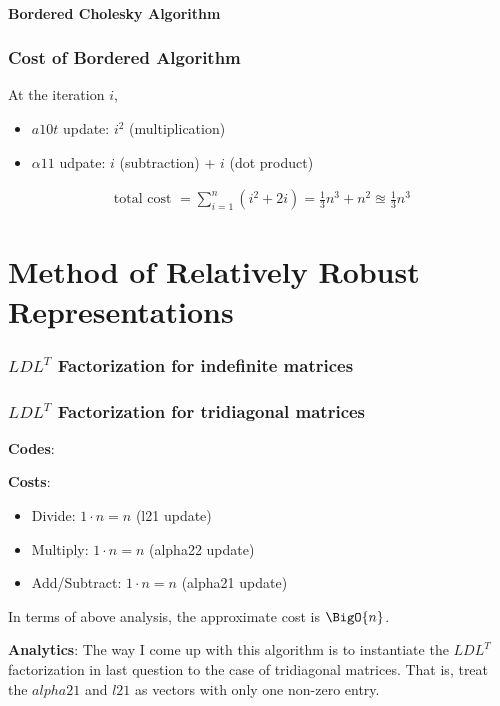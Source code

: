 \documentclass[11pt,a4paper]{article}
\begin{document}
\newpage
\subsection{Bordered Cholesky Algorithm}
 \vspace{0.5cm}

\section{Cost of Bordered Algorithm}
At the iteration $i$, 
\begin{itemize}
    \item $a10t$ update: $i^2$ (multiplication)
    \item $\alpha11$ udpate: $i$ (subtraction) + $i$ (dot product) 
\end{itemize}
\begin{align}
    \text{ total cost } = \sum_{i = 1}^n (i^2 + 2i) = \frac{1}{3} n^3 + n^2
    \approxeq \frac{1}{3} n^3
\end{align}
\newpage
\part{Method of Relatively Robust Representations}
\setcounter{section}{0}
\section{$LDL^T$ Factorization for indefinite matrices}

\newpage

\section{$LDL^T$ Factorization for tridiagonal matrices}
\textbf{Codes}:


\noindent
\textbf{Costs}: 
\begin{itemize}
    \item Divide: $ 1 \cdot n = n$ (l21 update)  
    \item Multiply: $1 \cdot n = n$ (alpha22 update)
    \item Add/Subtract: $1 \cdot n = n$ (alpha21 update) 
\end{itemize}
In terms of above analysis, the approximate cost is $\BigO{n}$. \vspace{0.5cm}

\noindent
\textbf{Analytics}: 
    The way I come up with this algorithm is to instantiate the $LDL^T$
    factorization in last question to the case of tridiagonal matrices. That
    is, treat the $alpha21$ and $l21$ as vectors with only one non-zero entry.
\end{document}
